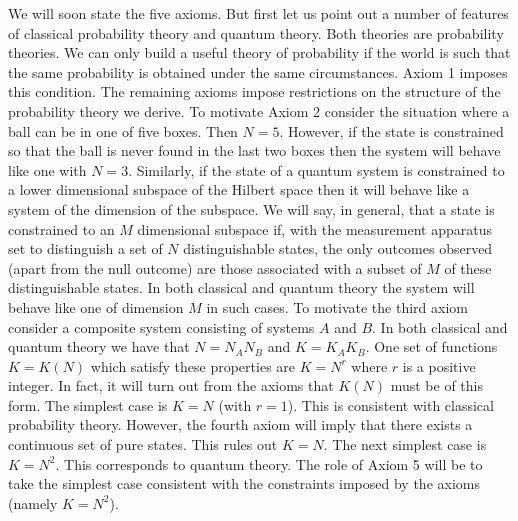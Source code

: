 \documentclass[10pt]{article}
\begin{document}
We will soon state the five axioms.  But first let us point out a number
of features of classical probability theory and quantum theory.
Both theories are probability theories.  We can only build a useful
theory of probability if the world is such that the same probability is
obtained under the same circumstances.  Axiom 1 imposes this condition.
The remaining axioms impose restrictions on the structure of the
probability theory we derive.  To motivate Axiom 2 consider
the situation where a ball can be in one of five boxes. Then
$N=5$.  However, if the state is constrained so that the ball is never
found in the last two boxes then the system will behave like one with
$N=3$.  Similarly, if the state of a quantum system is constrained to a lower
dimensional subspace of the Hilbert space then it will behave like a
system of the dimension of the subspace. We will say, in general, that a
state is constrained to an $M$ dimensional subspace if, with the
measurement apparatus set to distinguish a set of $N$ distinguishable
states, the only outcomes observed (apart from the null outcome)
are those associated with a subset of
$M$ of these distinguishable states.  In both classical and quantum
theory the system will behave like one of dimension $M$ in such cases.
To motivate the third axiom
consider a composite system consisting of systems $A$ and $B$.  In both
classical and quantum theory we have that $N=N_AN_B$ and $K=K_AK_B$.
One set of functions $K=K(N)$ which satisfy these properties are $K=N^r$
where $r$ is a positive integer.  In fact, it will turn out from the
axioms that $K(N)$ must be of this form.  The simplest case is $K=N$ (with
$r=1$).  This is consistent with classical probability theory.  However,
the fourth axiom will imply that there exists a continuous set of pure
states.  This rules out $K=N$.  The next simplest case is $K=N^2$.  This
corresponds to quantum theory.  The role of Axiom 5 will be to take the
simplest case consistent with the constraints imposed by the
axioms (namely $K=N^2$).
\end{document}
